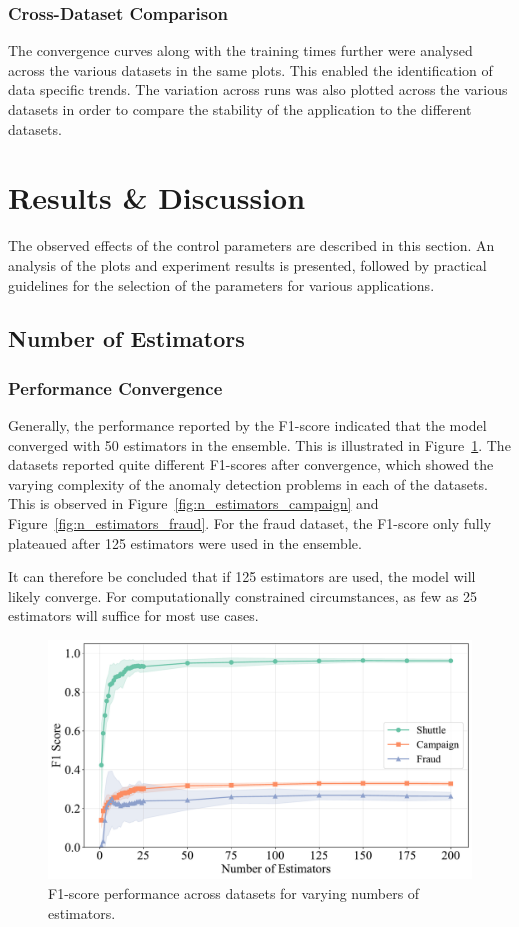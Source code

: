 \documentclass[10pt, conference]{IEEEtran}
\begin{document}
\subsubsection{Cross-Dataset Comparison}
The convergence curves along with the training times further were analysed across the various datasets in the same plots. This enabled the identification of data specific trends. The variation across runs was also plotted across the various datasets in order to compare the stability of the application to the different datasets.





\section{Results \& Discussion}
The observed effects of the control parameters are described in this section. An analysis of the plots and experiment results is presented, followed by practical guidelines for the selection of the parameters for various applications.
\subsection{Number of Estimators}
\subsubsection{Performance Convergence}
Generally, the performance reported by the F1-score indicated that the model converged with 50 estimators in the ensemble. This is illustrated in Figure~\ref{fig:n_estimators_f1}. The  datasets reported quite different F1-scores after convergence, which showed the varying complexity of the anomaly detection problems in each of the datasets. This is observed in Figure~\ref{fig:n_estimators_campaign} and Figure~\ref{fig:n_estimators_fraud}. For the fraud dataset, the F1-score only fully plateaued after 125 estimators were used in the ensemble. 

It can therefore be concluded that if 125 estimators are used, the model will likely converge. For computationally constrained circumstances, as few as 25 estimators will suffice for most use cases.
\begin{figure}[H]
	\centering
	\includegraphics[width=0.95\linewidth]{../results/multi_dataset/n_estimators_f1.pdf}
	\caption{F1-score performance across datasets for varying numbers of estimators.}
	\label{fig:n_estimators_f1}
\end{figure}
\end{document}
